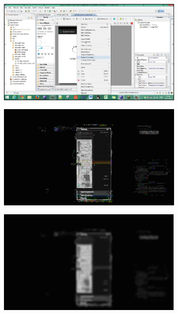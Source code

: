 \documentclass[10pt]{article}
\begin{document}
\begin{figure}
    \centering
    \begin{subfigure}{0.3\textwidth}
        \includegraphics[width=\textwidth]{fig/pipeline1}
        \caption{}
        \label{fig:pipeline1}
        \vspace*{2mm}
    \end{subfigure}
    \begin{subfigure}{0.3\textwidth}
        \includegraphics[width=\textwidth]{fig/pipeline2}
        \caption{}
        \label{fig:pipeline2}
        \vspace*{2mm}
    \end{subfigure}
    \begin{subfigure}{0.3\textwidth}
        \includegraphics[width=\textwidth]{fig/pipeline3}

\end{subfigure}
\end{figure}
\end{document}
